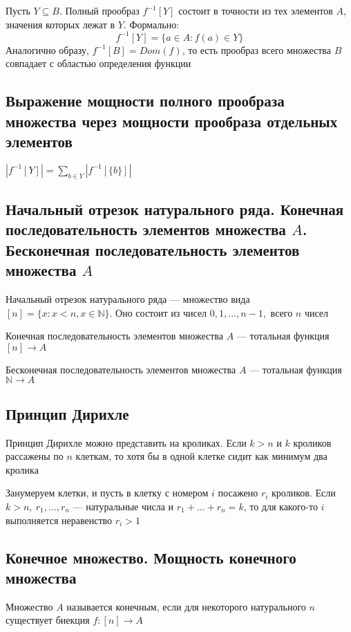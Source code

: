 \documentclass[a4paper]{article}
\begin{document}
 Пусть $Y\subseteq B$. Полный прообраз $f^{-1}[Y]$ состоит в точности из тех элементов $A$, значения которых лежат в $Y$. Формально:
\begin{equation*}
    f^{-1}[Y]=\{a\in A: f(a)\in Y\}
\end{equation*}
Аналогично образу, $f^{-1}[B]=Dom(f)$, то есть прообраз всего множества $B$ совпадает с областью определения функции

\subsection{Выражение мощности полного прообраза множества через мощности прообраза отдельных элементов}
\label{sec:1.28}$|f^{-1}[Y]|=\sum\limits_{b\in Y} |f^{-1}[\{b\}]|$


\subsection{Начальный отрезок натурального ряда. Конечная последовательность элементов множества $A$. Бесконечная последовательность элементов множества $A$}
 Начальный отрезок натурального ряда — множество вида $[n]=\{x: x<n, x\in\mathbb{N}\}$. Оно состоит из чисел $0, 1, \ldots, n-1,$ всего $n$ чисел

 Конечная последовательность элементов множества $A$ — тотальная функция $[n]\rightarrow A$

 Бесконечная последовательность элементов множества $A$ — тотальная функция $\mathbb{N}\rightarrow A$


\subsection{Принцип Дирихле}
Принцип Дирихле можно представить на кроликах. Если $k>n$ и $k$ кроликов рассажены по $n$ клеткам, то хотя бы в одной клетке сидит как минимум два кролика

Занумеруем клетки, и пусть в клетку с номером $i$ посажено $r_i$ кроликов. Если $k>n,\ r_1,\ldots,r_n$ — натуральные числа и $r_1+\ldots+r_n=k$, то для какого-то $i$ выполняется неравенство $r_i>1$

\subsection{Конечное множество. Мощность конечного множества}
\label{sec:intro}
 Множество $A$ называется конечным, если для некоторого натурального $n$ существует биекция $f: [n]\rightarrow A$
\end{document}
